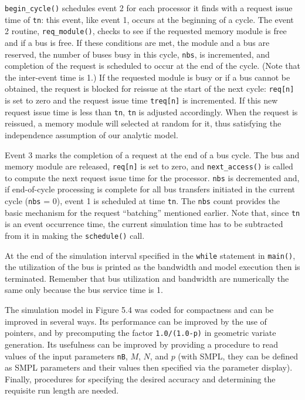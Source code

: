 \texttt{begin\_cycle()} schedules event 2 for each processor it finds with a
request issue time of \texttt{tn}: this event, like event 1, occurs at the beginning of a
cycle. The event 2 routine, \texttt{req\_module()}, checks to see if the requested
\noindent memory module is free and if a bus is free. If these conditions are met, the
module and a bus are reserved, the number of buses busy in this cycle, \texttt{nbs}, is
incremented, and completion of the request is scheduled to occur at the end of
the cycle. (Note that the inter-event time is 1.) If the requested module is
busy or if a bus cannot be obtained, the request is blocked for reissue at the
start of the next cycle: \texttt{req[n]} is set to zero and the request issue time
\texttt{treq[n]} is incremented. If this new request issue time is less than \texttt{tn}, \texttt{tn} is
adjusted accordingly. When the request is reissued, a memory module will
selected at random for it, thus satisfying the independence assumption of our
analytic model.

Event 3 marks the completion of a request at the end of a bus cycle. The
bus and memory module are released, \texttt{req[n]} is set to zero, and
\texttt{next\_access()} is called to compute the next request issue time for the processor.
\texttt{nbs} is decremented and, if end-of-cycle processing is complete for all
bus transfers initiated in the current cycle (\texttt{nbs} = 0), event 1 is scheduled at
time \texttt{tn}. The \texttt{nbs} count provides the basic mechanism for the request
``batching'' mentioned earlier. Note that, since \texttt{tn} is an event occurrence
time, the current simulation time has to be subtracted from it in making the
\texttt{schedule()} call.

At the end of the simulation interval specified in the \texttt{while} statement
in \texttt{main()}, the utilization of the bus is printed as the bandwidth and model
execution then is terminated. Remember that bus utilization and bandwidth
are numerically the same only because the bus service time is 1.

The simulation model in Figure 5.4 was coded for compactness and can be
improved in several ways. Its performance can be improved by the use of
pointers, and by precomputing the factor \texttt{1.0/(1.0-p)} in geometric variate
generation. Its usefulness can be improved by providing a procedure to read
values of the input parameters \texttt{nB}, $M$, $N$, and $p$ (with SMPL, they can be
defined as SMPL parameters and their values then specified via the parameter
display). Finally, procedures for specifying the desired accuracy and
determining the requisite run length are needed.

